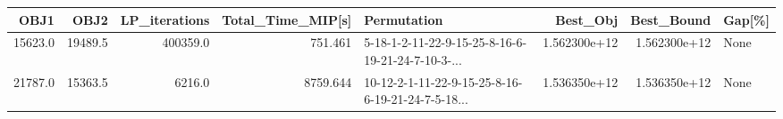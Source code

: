 \begin{tabular}{rrrrlrrl}
\toprule
     OBJ1 &     OBJ2 &   LP\_iterations &  Total\_Time\_MIP[s] &                                        Permutation &      Best\_Obj &    Best\_Bound & Gap[\%] \\
\midrule
 15623.0 &  19489.5 &            400359.0 &            751.461 &  5-18-1-2-11-22-9-15-25-8-16-6-19-21-24-7-10-3-... &       1.562300e+12 &  1.562300e+12 &   None \\
 21787.0 &  15363.5 &            6216.0 &            8759.644 &  10-12-2-1-11-22-9-15-25-8-16-6-19-21-24-7-5-18... &       1.536350e+12 &  1.536350e+12 &   None  \\
\bottomrule
\end{tabular}
